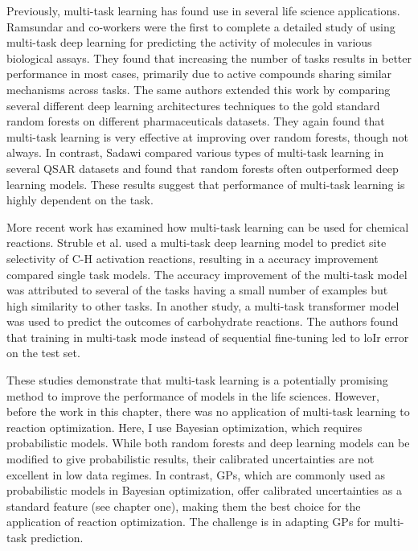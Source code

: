 Previously, multi-task learning has found use in several life science applications. Ramsundar and co-workers were the first to complete a detailed study of using multi-task deep learning for predicting the activity of molecules in various biological assays.\cite{Ramsundar2015} They found that increasing the number of tasks results in better performance in most cases, primarily due to active compounds sharing similar mechanisms across tasks. The same authors extended this work by comparing several different deep learning architectures techniques to the gold standard random forests on different pharmaceuticals datasets. They again found that multi-task learning is very effective at improving over random forests, though not always.\cite{Ramsundar2017} In contrast, Sadawi compared various types of multi-task learning in several QSAR datasets and found that random forests often outperformed deep learning models.\cite{Sadawi2019} These results suggest that performance of multi-task learning is highly dependent on the task.

More recent work has examined how multi-task learning can be used for chemical reactions. Struble et al. used a multi-task deep learning model to predict site selectivity of C-H activation reactions, resulting in a accuracy improvement compared single task models.\cite{Struble2020} The accuracy improvement of the multi-task model was attributed to several of the tasks having a small number of examples but high similarity to other tasks. In another study, a multi-task transformer model was used to predict the outcomes of carbohydrate reactions.\cite{Pesciullesi2020} The authors found that training in multi-task mode instead of sequential fine-tuning led to loIr error on the test set. 

These studies demonstrate that multi-task learning is a potentially promising method to improve the performance of models in the life sciences. However, before the work in this chapter, there was no application of multi-task learning to reaction optimization. Here, I use Bayesian optimization, which requires probabilistic models. While both random forests and deep learning models can be modified to give probabilistic results,\cite{Ling2017, Duan2020, Soleimany2021} their calibrated uncertainties are not excellent in low data regimes. In contrast, GPs, which are commonly used as probabilistic models in Bayesian optimization, offer calibrated uncertainties as a standard feature (see chapter one), making them the best choice for the application of reaction optimization. The challenge is in adapting GPs for multi-task prediction.

